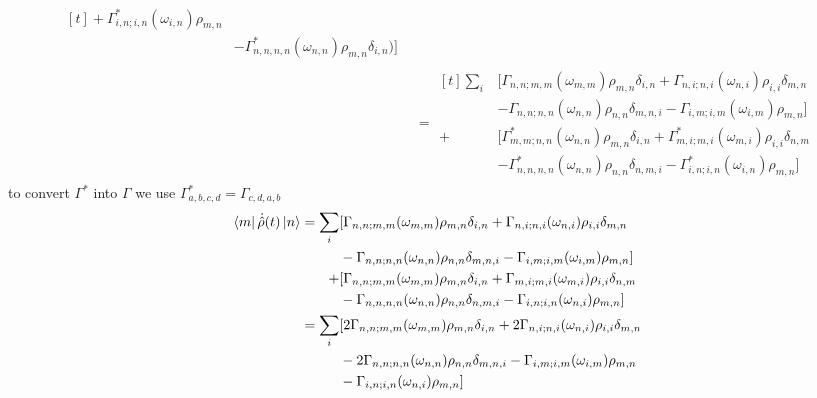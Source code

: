 \begin{align}
\begin{aligned}[t]
    + \Gamma^*_{i, n; i,n}(\omega_{i,n})\rho_{m, n}              \\ &
        - \Gamma^*_{n,n,n,n}(\omega_{n,n})\rho_{m, n}\delta_{i, n})]
  \end{aligned}  \\
                                     & = \begin{aligned}[t]
    \sum_{i} &
    [ \Gamma_{n,n;m, m}(\omega_{m,m})\rho_{m, n}\delta_{i,n}
    + \Gamma_{n,i;n, i}(\omega_{n,i})\rho_{i, i}\delta_{m,n}    \\
             &
        - \Gamma_{n,n;n,n}(\omega_{n,n})\rho_{n,n}\delta_{m,n,i}
    - \Gamma_{i,m;i, m}(\omega_{i,m})\rho_{m, n}]               \\
    +        &
    [ \Gamma^*_{m,m; n,n}(\omega_{n,n})\rho_{m, n}\delta_{i,n}
    + \Gamma^*_{m,i; m,i}(\omega_{m,i})\rho_{i, i}\delta_{n, m} \\
             &
        - \Gamma^*_{n,n,n,n}(\omega_{n,n})\rho_{n,n}\delta_{n, m,i}
        - \Gamma^*_{i,n; i,n}(\omega_{i,n})\rho_{m, n}]
  \end{aligned}
\end{align}
to convert \(\Gamma^*\)
into \(\Gamma \) we use
\(\Gamma^*_{a,b,c,d} = \Gamma_{c, d, a, b}\)
\begin{align}
  \bra{m}\dot{\hat{\rho}}(t) \ket{n} & = \begin{aligned}[t]
    \sum_{i} &
    [ \Gamma_{n,n;m, m}(\omega_{m,m})\rho_{m, n}\delta_{i,n}
    + \Gamma_{n,i;n, i}(\omega_{n,i})\rho_{i, i}\delta_{m,n} \\
             &
        - \Gamma_{n,n;n,n}(\omega_{n,n})\rho_{n,n}\delta_{m,n,i}
    - \Gamma_{i,m;i, m}(\omega_{i,m})\rho_{m, n}]            \\
    +        &
    [ \Gamma_{n,n; m, m}(\omega_{m,m})\rho_{m, n}\delta_{i,n}
    + \Gamma_{m,i;m,i}(\omega_{m,i})\rho_{i, i}\delta_{n, m} \\
             &
        - \Gamma_{n,n,n,n}(\omega_{n,n})\rho_{n,n}\delta_{n, m,i}
        - \Gamma_{ i,n; i,n}(\omega_{n,i})\rho_{m, n}]
  \end{aligned} \\
                                     & = \begin{aligned}[t]
    \sum_{i} &
    [2 \Gamma_{n,n;m, m}(\omega_{m,m})\rho_{m, n}\delta_{i,n}
    + 2\Gamma_{n,i;n, i}(\omega_{n,i})\rho_{i, i}\delta_{m,n} \\
             &
        - 2\Gamma_{n,n;n,n}(\omega_{n,n})\rho_{n,n}\delta_{m,n,i}
    - \Gamma_{i,m;i, m}(\omega_{i,m})\rho_{m, n}              \\
             &
        - \Gamma_{ i,n; i,n}(\omega_{n,i})\rho_{m, n}]
  \end{aligned}
\end{align}
